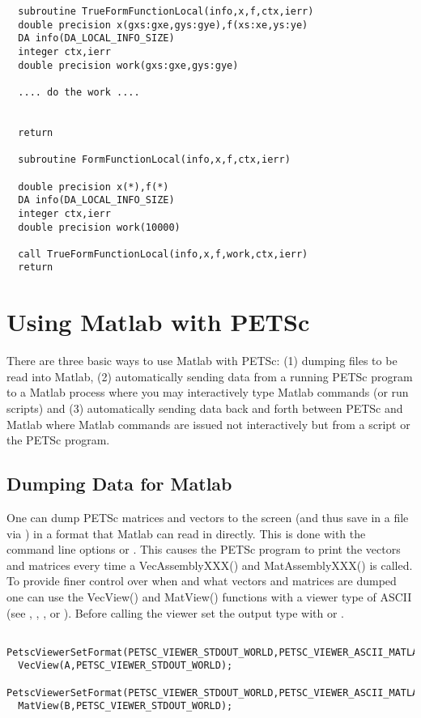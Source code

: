 \begin{verbatim}
  subroutine TrueFormFunctionLocal(info,x,f,ctx,ierr)
  double precision x(gxs:gxe,gys:gye),f(xs:xe,ys:ye)
  DA info(DA_LOCAL_INFO_SIZE)
  integer ctx,ierr
  double precision work(gxs:gxe,gys:gye)
   
  .... do the work ....


  return
   
  subroutine FormFunctionLocal(info,x,f,ctx,ierr)

  double precision x(*),f(*)
  DA info(DA_LOCAL_INFO_SIZE)
  integer ctx,ierr
  double precision work(10000)

  call TrueFormFunctionLocal(info,x,f,work,ctx,ierr)
  return
\end{verbatim}

\chapter{Using Matlab with PETSc}
\label{ch:matlab}

There are three basic ways to use Matlab with PETSc: (1) dumping files to 
be read into Matlab, (2) automatically sending data from a running PETSc program
to a Matlab process where you may interactively type Matlab commands (or run
scripts) and (3) automatically sending data back and forth between PETSc and 
Matlab where Matlab commands are issued not interactively but from a script or
the PETSc program.

\section{Dumping Data for Matlab}
One can dump PETSc matrices and vectors to the screen (and thus save in a file via
) in a format that Matlab can read in directly. This is done with the
command line options  or . This causes the PETSc program
to print the vectors and matrices every time a VecAssemblyXXX() and MatAssemblyXXX()
is called.   To provide finer control
over when and what vectors and matrices are dumped one can use the VecView() and 
MatView() functions with a viewer type of ASCII (see , 
, , or ). Before calling
the viewer set the output type with  or
. 
\begin{verbatim}
  PetscViewerSetFormat(PETSC_VIEWER_STDOUT_WORLD,PETSC_VIEWER_ASCII_MATLAB);
  VecView(A,PETSC_VIEWER_STDOUT_WORLD);
  PetscViewerSetFormat(PETSC_VIEWER_STDOUT_WORLD,PETSC_VIEWER_ASCII_MATLAB);
  MatView(B,PETSC_VIEWER_STDOUT_WORLD);
\end{verbatim}

